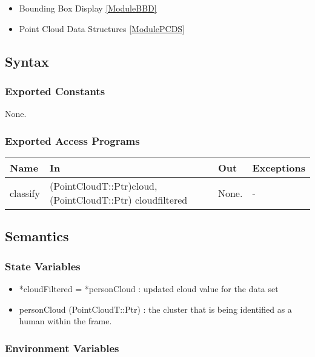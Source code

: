 \documentclass[12pt, titlepage]{article}
\begin{document}
\begin{itemize}
  \item Bounding Box Display \ref{ModuleBBD}
  \item Point Cloud Data Structures \ref{ModulePCDS}
\end{itemize}

\subsection{Syntax}

\subsubsection{Exported Constants}

None.

\subsubsection{Exported Access Programs}

\begin{center}
\begin{tabular}{p{2cm} p{5cm} p{4cm} p{2cm}}
\hline
\textbf{Name} & \textbf{In} & \textbf{Out} & \textbf{Exceptions} \\
\hline
classify & (PointCloudT::Ptr)cloud, (PointCloudT::Ptr) cloudfiltered & None. & - \\
\hline
\end{tabular}
\end{center}

\subsection{Semantics}

\subsubsection{State Variables}

\begin{itemize}
  \item *cloudFiltered = *personCloud : updated cloud value for the data set
  \item personCloud (PointCloudT::Ptr) : the cluster that is being identified as a human within the frame.
\end{itemize}

\subsubsection{Environment Variables}
\end{document}
